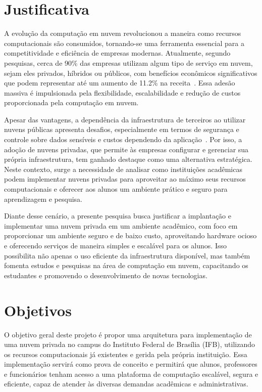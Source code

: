 \section{Justificativa} 

A evolução da computação em nuvem revolucionou a maneira como recursos computacionais são consumidos, tornando-se uma ferramenta essencial para a competitividade e eficiência de empresas modernas. Atualmente, segundo pesquisas, cerca de 90\% das empresas utilizam algum tipo de serviço em nuvem, sejam eles privados, híbridos ou públicos, com benefícios econômicos significativos que podem representar até um aumento de 11.2\% na receita~\citep{StatisticsCloud, ProfitCloud}. Essa adesão massiva é impulsionada pela flexibilidade, escalabilidade e redução de custos proporcionada pela computação em nuvem.

Apesar das vantagens, a dependência da infraestrutura de terceiros ao utilizar nuvens públicas apresenta desafios, especialmente em termos de segurança e controle sobre dados sensíveis e custos dependendo da aplicação~\citep{privateCloudAdvantagesDisadvantages}. Por isso, a adoção de nuvens privadas, que permite às empresas configurar e gerenciar sua própria infraestrutura, tem ganhado destaque como uma alternativa estratégica. Neste contexto, surge a necessidade de analisar como instituições acadêmicas podem implementar nuvens privadas para aproveitar ao máximo seus recursos computacionais e oferecer aos alunos um ambiente prático e seguro para aprendizagem e pesquisa.

Diante desse cenário, a presente pesquisa busca justificar a implantação e implementar uma nuvem privada em um ambiente acadêmico, com foco em proporcionar um ambiente seguro e de baixo custo, aproveitando hardware ocioso e oferecendo serviços de maneira simples e escalável para os alunos. Isso possibilita não apenas o uso eficiente da infraestrutura disponível, mas também fomenta estudos e pesquisas na área de computação em nuvem, capacitando os estudantes e promovendo o desenvolvimento de novas tecnologias.

\section{Objetivos}

O objetivo geral deste projeto é propor uma arquitetura para implementação de uma nuvem privada no campus do Instituto Federal de Brasília (IFB), utilizando os recursos computacionais já existentes e gerida pela própria instituição. Essa implementação servirá como prova de conceito e permitirá que alunos, professores e funcionários tenham acesso a uma plataforma de computação escalável, segura e eficiente, capaz de atender às diversas demandas acadêmicas e administrativas.

